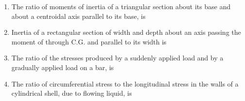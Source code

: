 \documentclass[11pt,a4paper]{article}
\begin{document}
\begin{enumerate}
\item{The ratio of moments of inertia of a triangular section about its base and about a centroidal axis parallel to its base, is}
\\
\item{Inertia of a rectangular section of width and depth about an axis passing the moment of through C.G. and parallel to its width is}
\\
\item{The ratio of the stresses produced by a suddenly applied load and by a gradually applied load on a bar, is}
\\
\item{The ratio of circumferential stress to the longitudinal stress in the walls of a cylindrical shell, due to flowing liquid, is}
\\\begin{enumerate*}[itemjoin=\qquad, label=\Alph*.]

\end{enumerate*}
\end{enumerate}
\end{document}
